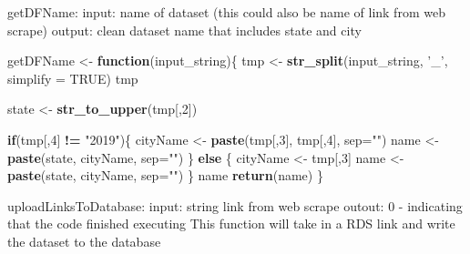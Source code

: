 \documentclass[
]{book}
\newenvironment{Shaded}{\begin{snugshade}}{\end{snugshade}}
\newcommand{\ControlFlowTok}[1]{\textcolor[rgb]{0.13,0.29,0.53}{\textbf{#1}}}
\newcommand{\DataTypeTok}[1]{\textcolor[rgb]{0.13,0.29,0.53}{#1}}
\newcommand{\DecValTok}[1]{\textcolor[rgb]{0.00,0.00,0.81}{#1}}
\newcommand{\KeywordTok}[1]{\textcolor[rgb]{0.13,0.29,0.53}{\textbf{#1}}}
\newcommand{\NormalTok}[1]{#1}
\newcommand{\OperatorTok}[1]{\textcolor[rgb]{0.81,0.36,0.00}{\textbf{#1}}}
\newcommand{\OtherTok}[1]{\textcolor[rgb]{0.56,0.35,0.01}{#1}}
\newcommand{\StringTok}[1]{\textcolor[rgb]{0.31,0.60,0.02}{#1}}
\begin{document}
\begin{Shaded}
\end{Shaded}

getDFName:
input: name of dataset (this could also be name of link from web scrape)
output: clean dataset name that includes state and city

\begin{Shaded}
\begin{Highlighting}[]
\NormalTok{getDFName <-}\StringTok{ }\ControlFlowTok{function}\NormalTok{(input_string)\{}
\NormalTok{  tmp <-}\StringTok{ }\KeywordTok{str_split}\NormalTok{(input_string, }\StringTok{'_'}\NormalTok{, }\DataTypeTok{simplify =} \OtherTok{TRUE}\NormalTok{)}
\NormalTok{  tmp}
  
\NormalTok{  state <-}\StringTok{ }\KeywordTok{str_to_upper}\NormalTok{(tmp[,}\DecValTok{2}\NormalTok{])}
  
  \ControlFlowTok{if}\NormalTok{(tmp[,}\DecValTok{4}\NormalTok{] }\OperatorTok{!=}\StringTok{ "2019"}\NormalTok{)\{}
\NormalTok{      cityName <-}\StringTok{ }\KeywordTok{paste}\NormalTok{(tmp[,}\DecValTok{3}\NormalTok{], tmp[,}\DecValTok{4}\NormalTok{], }\DataTypeTok{sep=}\StringTok{""}\NormalTok{)}
\NormalTok{      name <-}\StringTok{ }\KeywordTok{paste}\NormalTok{(state, cityName, }\DataTypeTok{sep=}\StringTok{""}\NormalTok{)}
\NormalTok{  \} }\ControlFlowTok{else}\NormalTok{ \{}
\NormalTok{      cityName <-}\StringTok{ }\NormalTok{tmp[,}\DecValTok{3}\NormalTok{]}
\NormalTok{      name <-}\StringTok{ }\KeywordTok{paste}\NormalTok{(state, cityName, }\DataTypeTok{sep=}\StringTok{""}\NormalTok{)}
\NormalTok{  \}}
\NormalTok{  name}
  \KeywordTok{return}\NormalTok{(name)}
\NormalTok{\}}
\end{Highlighting}
\end{Shaded}

uploadLinksToDatabase:
input: string link from web scrape
outout: 0 - indicating that the code finished executing
This function will take in a RDS link and write the dataset to the database
\end{document}
